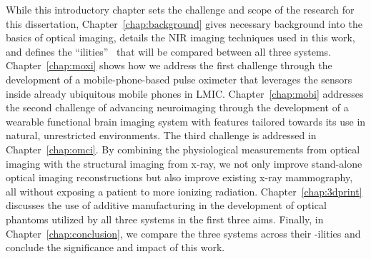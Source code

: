 While this introductory chapter sets the challenge and scope of the research for this dissertation, Chapter~\ref{chap:background} gives necessary background into the basics of optical imaging, details the \ac{NIR} imaging techniques used in this work, and defines the ``ilities''~\cite{DeWeck2012} that will be compared between all three systems. Chapter~\ref{chap:moxi} shows how we address the first challenge through the development of a mobile-phone-based pulse oximeter that leverages the sensors inside already ubiquitous mobile phones in \ac{LMIC}. Chapter~\ref{chap:mobi} addresses the second challenge of advancing neuroimaging through the development of a wearable functional brain imaging system with features tailored towards its use in natural, unrestricted environments. The third challenge is addressed in Chapter~\ref{chap:omci}. By combining the physiological measurements from optical imaging with the structural imaging from x-ray, we not only improve stand-alone optical imaging reconstructions but also improve existing x-ray mammography, all without exposing a patient to more ionizing radiation. Chapter~\ref{chap:3dprint} discusses the use of additive manufacturing in the development of optical phantoms utilized by all three systems in the first three aims. Finally, in Chapter~\ref{chap:conclusion}, we compare the three systems across their -ilities and conclude the significance and impact of this work.


